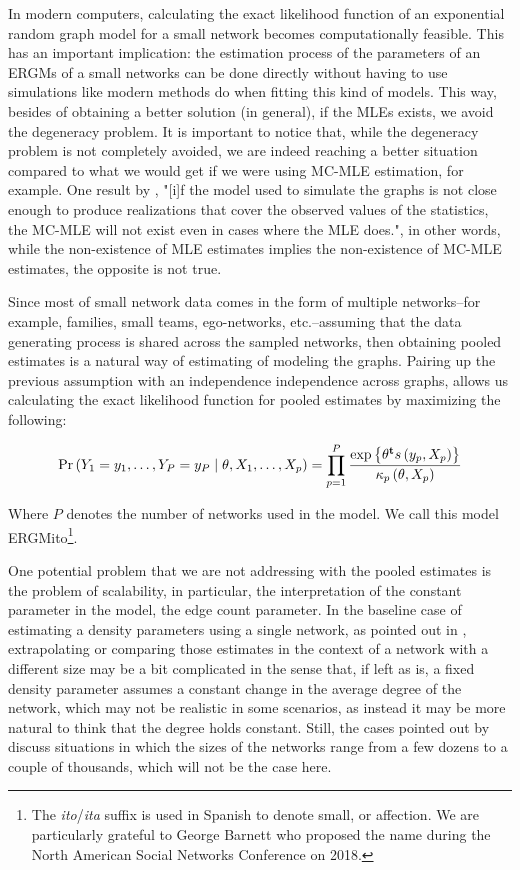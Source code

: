 \documentclass[12pt]{article}
\begin{document}
In modern computers, calculating the exact likelihood function of an exponential random graph model for a small network becomes computationally feasible. This has an important implication: the estimation process of the parameters of an ERGMs of a small networks can be done directly without having to use simulations like modern methods do when fitting this kind of models. This way, besides of obtaining a better solution (in general), if the MLEs exists, we avoid the degeneracy problem. It is important to notice that, while the degeneracy problem is not completely avoided, we are indeed reaching a better situation compared to what we would get if we were using MC-MLE estimation, for example. One result by \cite[p. 7]{Handcock2003}, "[i]f the model used to simulate the graphs is not close enough to produce realizations that cover the observed values of the statistics, the MC-MLE will not exist even in cases where the MLE does.", in other words, while the non-existence of MLE estimates implies the non-existence of MC-MLE estimates, the opposite is not true.

Since most of small network data comes in the form of multiple networks--for example, families, small teams, ego-networks, etc.--assuming that the data generating process is shared across the sampled networks, then obtaining pooled estimates is a natural way of estimating of modeling the graphs. Pairing up the previous assumption with an independence independence across graphs, allows us calculating the exact likelihood function for pooled estimates by maximizing the following:

\begin{equation}
    \label{eq:ergm-pooled}
    \Prcond{\Adjmat_1 = \adjmat_1, \dots, \Adjmat_P = \adjmat_P}{\params, \Indepvar_1, \dots, \Indepvar_p} = \prod_{p=1}^P\frac{%
    		\exp{\transpose{\params}\sufstats{\adjmat_p, \Indepvar_p}}%
    	}{
    		\kappa_p\left(\params, \Indepvar_p\right)
    	}
\end{equation}

\noindent Where $P$ denotes the number of networks used in the model. We call this model ERGMito\footnote{The \textit{ito}/\textit{ita} suffix is used in Spanish to denote small, or affection. We are particularly grateful to George Barnett who proposed the name during the North American Social Networks Conference on 2018.}.

One potential problem that we are not addressing with the pooled estimates is the problem of scalability, in particular, the interpretation of the constant parameter in the model, the edge count parameter. In the baseline case of estimating a density parameters using a single network, as pointed out in \cite{Krivitsky2011}, extrapolating or comparing those estimates in the context of a network with a different size may be a bit complicated in the sense that, if left as is, a fixed density parameter assumes a constant change in the average degree of the network, which may not be realistic in some scenarios, as instead it may be more natural to think that the degree holds constant. Still, the cases pointed out by \cite{Krivitsky2011} discuss situations in which the sizes of the networks range from a few dozens to a couple of thousands, which will not be the case here.
\end{document}
